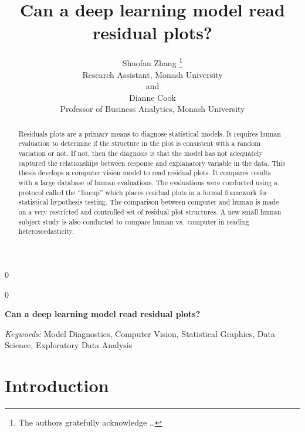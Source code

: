 \documentclass[12pt]{article}
\newcommand{\blind}{0}
\begin{document}
\def\spacingset#1{\renewcommand{\baselinestretch}%
{#1}\small\normalsize} \spacingset{1}



\blind
{
  \title{\bf Can a deep learning model read residual plots?}

  \author{
        Shuofan Zhang \thanks{The authors gratefully acknowledge \ldots{}} \\
    Research Assistant, Monash University\\
     and \\     Dianne Cook \\
    Professor of Business Analytics, Monash University\\
      }
  \maketitle
} \fi

\blind
{
  \bigskip
  \bigskip
  \bigskip
  \begin{center}
    {\LARGE\bf Can a deep learning model read residual plots?}
  \end{center}
  \medskip
} \fi

\bigskip
\begin{abstract}
Residuals plots are a primary means to diagnose statistical models. It
requires human evaluation to determine if the structure in the plot is
consistent with a random variation or not. If not, then the diagnosis is
that the model has not adequately captured the relationships between
response and explanatory variable in the data. This thesis develops a
computer vision model to read residual plots. It compares results with a
large database of human evaluations. The evaluations were conducted
using a protocol called the ``lineup'' which places residual plots in a
formal framework for statistical hypothesis testing. The comparison
between computer and human is made on a very restricted and controlled
set of residual plot structures. A new small human subject study is also
conducted to compare human vs.~computer in reading heteroscedasticity.
\end{abstract}

\noindent%
{\it Keywords:} Model Diagnostics, Computer Vision, Statistical Graphics, Data Science, Exploratory Data Analysis
\vfill

\newpage
\spacingset{1.45} %

\section{Introduction}\label{introduction}
\end{document}
